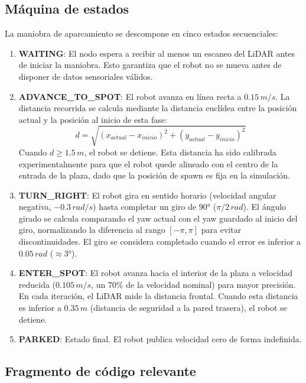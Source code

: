 \subsection*{Máquina de estados}

La maniobra de aparcamiento se descompone en cinco estados secuenciales:

\begin{enumerate}
	\item \textbf{WAITING}: El nodo espera a recibir al menos un escaneo del LiDAR antes de iniciar la maniobra. Esto garantiza que el robot no se mueva antes de disponer de datos sensoriales válidos.
	
	\item \textbf{ADVANCE\_TO\_SPOT}: El robot avanza en línea recta a $0.15\,m/s$. La distancia recorrida se calcula mediante la distancia euclídea entre la posición actual y la posición al inicio de esta fase:
	\begin{equation}
		d = \sqrt{(x_{actual} - x_{inicio})^2 + (y_{actual} - y_{inicio})^2}
	\end{equation}
	Cuando $d \geq 1.5\,m$, el robot se detiene. Esta distancia ha sido calibrada experimentalmente para que el robot quede alineado con el centro de la entrada de la plaza, dado que la posición de spawn es fija en la simulación.
	
	\item \textbf{TURN\_RIGHT}: El robot gira en sentido horario (velocidad angular negativa, $-0.3\,rad/s$) hasta completar un giro de $90°$ ($\pi/2\,rad$). El ángulo girado se calcula comparando el yaw actual con el yaw guardado al inicio del giro, normalizando la diferencia al rango $[-\pi, \pi]$ para evitar discontinuidades. El giro se considera completado cuando el error es inferior a $0.05\,rad$ ($\approx 3°$).
	
	\item \textbf{ENTER\_SPOT}: El robot avanza hacia el interior de la plaza a velocidad reducida ($0.105\,m/s$, un 70\% de la velocidad nominal) para mayor precisión. En cada iteración, el LiDAR mide la distancia frontal. Cuando esta distancia es inferior a $0.35\,m$ (distancia de seguridad a la pared trasera), el robot se detiene.
	
	\item \textbf{PARKED}: Estado final. El robot publica velocidad cero de forma indefinida.
\end{enumerate}

\subsection*{Fragmento de código relevante}

